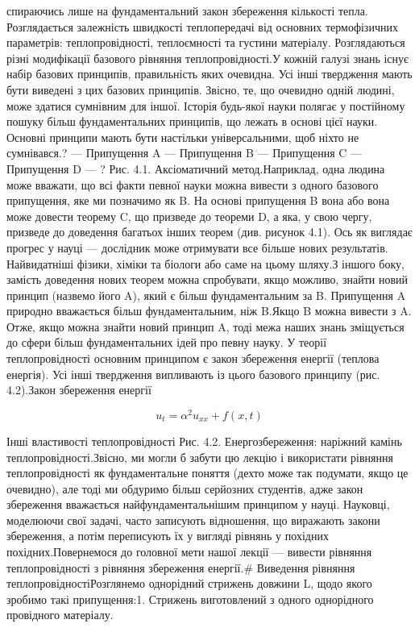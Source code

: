 \documentclass[
  ukrainian,
]{article}
\begin{document}
спираючись лише на фундаментальний закон збереження кількості тепла.
Розглядається залежність швидкості теплопередачі від основних
термофізичних параметрів: теплопровідності, теплоємності та густини
матеріалу. Розглядаються різні модифікації базового рівняння
теплопровідності.У кожній галузі знань існує набір базових принципів,
правильність яких очевидна. Усі інші твердження мають бути виведені з
цих базових принципів. Звісно, те, що очевидно одній людині, може
здатися сумнівним для іншої. Історія будь-якої науки полягає у
постійному пошуку більш фундаментальних принципів, що лежать в основі
цієї науки. Основні принципи мають бути настільки універсальними, щоб
ніхто не сумнівався.? --- Припущення A --- Припущення B --- Припущення C
--- Припущення D --- ? Рис. 4.1. Аксіоматичний метод.Наприклад, одна
людина може вважати, що всі факти певної науки можна вивести з одного
базового припущення, яке ми позначимо як B. На основі припущення B вона
або вона може довести теорему C, що призведе до теореми D, а яка, у свою
чергу, призведе до доведення багатьох інших теорем (див. рисунок 4.1).
Ось як виглядає прогрес у науці --- дослідник може отримувати все більше
нових результатів. Найвидатніші фізики, хіміки та біологи або саме на
цьому шляху.З іншого боку, замість доведення нових теорем можна
спробувати, якщо можливо, знайти новий принцип (назвемо його A), який є
більш фундаментальним за B. Припущення A природно вважається більш
фундаментальним, ніж B.Якщо B можна вивести з A. Отже, якщо можна знайти
новий принцип A, тоді межа наших знань зміщується до сфери більш
фундаментальних ідей про певну науку. У теорії теплопровідності основним
принципом є закон збереження енергії (теплова енергія). Усі інші
твердження випливають із цього базового принципу (рис. 4.2).Закон
збереження енергії

\[
u_t = \alpha^2 u_{xx} + f(x,t)
\]

Інші властивості теплопровідності Рис. 4.2. Енергозбереження: наріжний
камінь теплопровідності.Звісно, ми могли б забути цю лекцію і
використати рівняння теплопровідності як фундаментальне поняття (дехто
може так подумати, якщо це очевидно), але тоді ми обдуримо більш
серйозних студентів, адже закон збереження вважається
найфундаментальнішим принципом у науці. Науковці, моделюючи свої задачі,
часто записують відношення, що виражають закони збереження, а потім
переписують їх у вигляді рівнянь у похідних похідних.Повернемося до
головної мети нашої лекції --- вивести рівняння теплопровідності з
рівняння збереження енергії.\# Виведення рівняння
теплопровідностіРозглянемо однорідний стрижень довжини L, щодо якого
зробимо такі припущення:1. Стрижень виготовлений з одного однорідного
провідного матеріалу.
\end{document}
